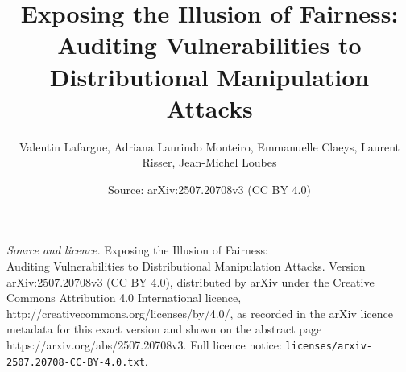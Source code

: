 \documentclass[10pt,a4paper]{amsart}
\title{\texorpdfstring{Exposing the Illusion of Fairness: \\ Auditing Vulnerabilities to Distributional Manipulation Attacks}{Exposing the Illusion of Fairness: - Auditing Vulnerabilities to Distributional Manipulation Attacks}}
\author{Valentin Lafargue, Adriana Laurindo Monteiro, Emmanuelle Claeys, Laurent Risser, Jean-Michel Loubes}
\date{Source: arXiv:2507.20708v3 (CC BY 4.0)}
\begin{document}
\maketitle

\noindent\emph{Source and licence.} \texorpdfstring{Exposing the Illusion of Fairness: \\ Auditing Vulnerabilities to Distributional Manipulation Attacks}{Exposing the Illusion of Fairness: - Auditing Vulnerabilities to Distributional Manipulation Attacks}. Version arXiv:2507.20708v3 (CC BY 4.0), distributed by arXiv under the Creative Commons Attribution 4.0 International licence, http://creativecommons.org/licenses/by/4.0/, as recorded in the arXiv licence metadata for this exact version and shown on the abstract page https://arxiv.org/abs/2507.20708v3. Full licence notice: \texttt{licenses/arxiv-2507.20708-CC-BY-4.0.txt}.\par\smallskip
\end{document}
